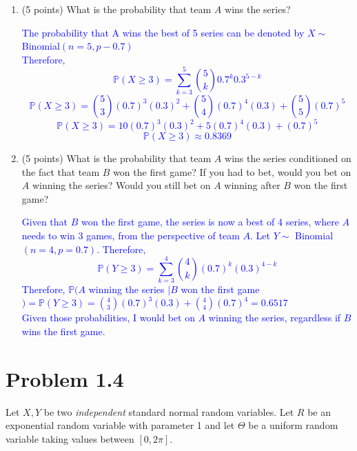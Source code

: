 \documentclass{article}
\begin{document}
\begin{enumerate}[label=(\alph*)]
    \item (5 points) What is the probability that team $A$ wins the series?

    \textcolor{blue}{The probability that A wins the best of 5 series can be denoted by $X\sim$ Binomial$(n=5,p-0.7)$ \\
        Therefore, $$\mathbb{P}(X \geq 3)=\sum_{k=3}^{5}\binom{5}{k}0.7^k0.3^{5-k}$$
        $$\mathbb{P}(X \geq 3)=\binom{5}{3}(0.7)^3(0.3)^2 + \binom{5}{4}(0.7)^4(0.3) + \binom{5}{5}(0.7)^5$$
        $$\mathbb{P}(X \geq 3)=10(0.7)^3(0.3)^2 + 5(0.7)^4(0.3) + (0.7)^5$$
        $$\mathbb{P}(X\geq 3)\approx 0.8369$$}

    \item (5 points) What is the probability that team $A$ wins the series conditioned on the fact that team $B$ won the first game? If you had to bet, would you bet on $A$ winning the series? Would you still bet on $A$ winning after $B$ won the first game?

        \textcolor{blue}{Given that $B$ won the first game, the series is now a best of 4 series, where $A$ needs to win 3 games, from the perspective of team $A$. Let $Y\sim$ Binomial$(n=4,p=0.7)$. Therefore, $$\mathbb{P}(Y \geq 3)=\sum_{k=3}^{4}\binom{4}{k}(0.7)^k(0.3)^{4-k}$$
        Therefore, $\mathbb{P}(A$ winning the series $| B$ won the first game$)=\mathbb{P}(Y \geq 3)=\binom{4}{3}(0.7)^3(0.3)+\binom{4}{4}(0.7)^4= 0.6517$ \\ 
        Given those probabilities, I would bet on $A$ winning the series, regardless if $B$ wins the first game.} 

\end{enumerate}

\section*{Problem 1.4}
Let $X, Y$ be two \textit{independent} standard normal random variables. Let $R$ be an exponential random variable with parameter 1 and let $\Theta$ be a uniform random variable taking values between $[0, 2\pi]$.
\end{document}
